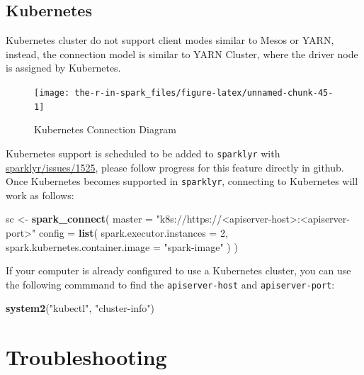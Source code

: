 \documentclass[]{book}
\newenvironment{Shaded}{\begin{snugshade}}{\end{snugshade}}
\newcommand{\DataTypeTok}[1]{\textcolor[rgb]{0.13,0.29,0.53}{#1}}
\newcommand{\DecValTok}[1]{\textcolor[rgb]{0.00,0.00,0.81}{#1}}
\newcommand{\KeywordTok}[1]{\textcolor[rgb]{0.13,0.29,0.53}{\textbf{#1}}}
\newcommand{\NormalTok}[1]{#1}
\newcommand{\StringTok}[1]{\textcolor[rgb]{0.31,0.60,0.02}{#1}}
\theoremstyle{definition}
\theoremstyle{definition}
\theoremstyle{definition}
\theoremstyle{remark}
\begin{document}
\hypertarget{kubernetes-1}{%
\subsection{Kubernetes}\label{kubernetes-1}}

Kubernetes cluster do not support client modes similar to Mesos or YARN,
instead, the connection model is similar to YARN Cluster, where the
driver node is assigned by Kubernetes.

\begin{figure}

{\centering \texttt{[image: the-r-in-spark\_files/figure-latex/unnamed-chunk-45-1]} 

}

\caption{Kubernetes Connection Diagram}\label{fig:unnamed-chunk-45}
\end{figure}

Kubernetes support is scheduled to be added to \texttt{sparklyr} with
\href{https://github.com/rstudio/sparklyr/issues/1525}{sparklyr/issues/1525},
please follow progress for this feature directly in github. Once
Kubernetes becomes supported in \texttt{sparklyr}, connecting to
Kubernetes will work as follows:

\begin{Shaded}
\begin{Highlighting}[]
\NormalTok{sc <-}\StringTok{ }\KeywordTok{spark_connect}\NormalTok{(}
  \DataTypeTok{master =} \StringTok{"k8s://https://<apiserver-host>:<apiserver-port>"}
  \DataTypeTok{config =} \KeywordTok{list}\NormalTok{(}
    \DataTypeTok{spark.executor.instances =} \DecValTok{2}\NormalTok{,}
    \DataTypeTok{spark.kubernetes.container.image =} \StringTok{"spark-image"}
\NormalTok{  )}
\NormalTok{)}
\end{Highlighting}
\end{Shaded}

If your computer is already configured to use a Kubernetes cluster, you
can use the following commmand to find the \texttt{apiserver-host} and
\texttt{apiserver-port}:

\begin{Shaded}
\begin{Highlighting}[]
\KeywordTok{system2}\NormalTok{(}\StringTok{"kubectl"}\NormalTok{, }\StringTok{"cluster-info"}\NormalTok{)}
\end{Highlighting}
\end{Shaded}

\hypertarget{troubleshooting}{%
\section{Troubleshooting}\label{troubleshooting}}
\end{document}
